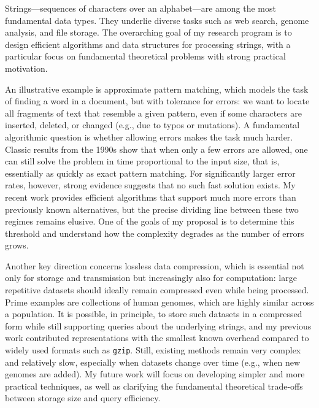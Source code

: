 \documentclass[a4paper,11pt]{article}
\begin{document}
\thispagestyle{firststyle}

Strings—sequences of characters over an alphabet—are among the most fundamental data types. They underlie diverse tasks such as web search, genome analysis, and file storage. The overarching goal of my research program is to design efficient algorithms and data structures for processing strings, with a particular focus on fundamental theoretical problems with strong practical motivation.

An illustrative example is approximate pattern matching, which models the task of finding a word in a document, but with tolerance for errors: we want to locate all fragments of text that resemble a given pattern, even if some characters are inserted, deleted, or changed (e.g., due to typos or mutations). A fundamental algorithmic question is whether allowing errors makes the task much harder. Classic results from the 1990s show that when only a few errors are allowed, one can still solve the problem in time proportional to the input size, that is, essentially as quickly as exact pattern matching. For significantly larger error rates, however, strong evidence suggests that no such fast solution exists. My recent work provides efficient algorithms that support much more errors than previously known alternatives, but the precise dividing line between these two regimes remains elusive. One of the goals of my proposal is to determine this threshold and understand how the complexity degrades as the number of errors grows.

Another key direction concerns lossless data compression, which is essential not only for storage and transmission but increasingly also for computation: large repetitive datasets should ideally remain compressed even while being processed. Prime examples are collections of human genomes, which are highly similar across a population. It is possible, in principle, to store such datasets in a compressed form while still supporting queries about the underlying strings, and my previous work contributed representations with the smallest known overhead compared to widely used formats such as \texttt{gzip}. Still, existing methods remain very complex and relatively slow, especially when datasets change over time (e.g., when new genomes are added). My future work will focus on developing simpler and more practical techniques, as well as clarifying the fundamental theoretical trade-offs between storage size and query efficiency.
\end{document}
